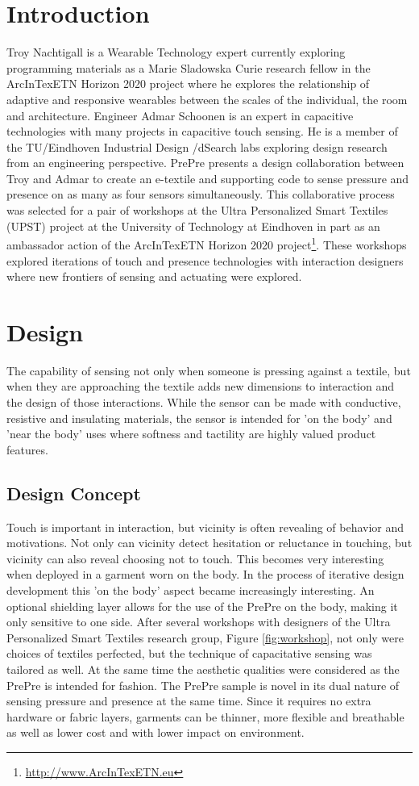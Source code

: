 \documentclass{sigchi-ext}
\begin{document}
\section{Introduction}
Troy Nachtigall is a Wearable Technology expert currently exploring programming materials as a Marie Sladowska Curie research fellow in the ArcInTexETN Horizon 2020 project where he explores the relationship of adaptive and responsive wearables between the scales of the individual, the room and architecture. Engineer Admar Schoonen is an expert in capacitive technologies with many projects in capacitive touch sensing.  He is a member of the TU/Eindhoven Industrial Design /dSearch labs exploring design research from an engineering perspective.  PrePre presents a design collaboration between Troy and Admar to create an e-textile and supporting code to sense pressure and  presence on as many as four sensors simultaneously.  This collaborative process was selected for a pair of workshops at the Ultra Personalized Smart Textiles (UPST) project at the University of Technology at Eindhoven in part as an ambassador action of the ArcInTexETN Horizon 2020 project\footnote{\url{http://www.ArcInTexETN.eu}}. These workshops explored iterations of touch and presence technologies with interaction designers where new frontiers of sensing and actuating were explored.  
\section{Design}
The capability of sensing not only when someone is pressing against a textile, but when they are approaching the textile adds new dimensions to interaction and the design of those interactions.  While the sensor can be made with conductive, resistive and insulating materials, the sensor is intended for 'on the body' and 'near the body' uses where softness and tactility are highly valued product features. 
\subsection{Design Concept}
Touch is important in interaction, but vicinity is often revealing of behavior and motivations.  Not only can vicinity detect hesitation or reluctance in touching, but vicinity can also reveal choosing not to touch. This becomes very interesting when deployed in a garment worn on the body. In the process of iterative design development this 'on the body' aspect became increasingly interesting. An optional shielding layer allows for the use of the PrePre on the body, making it only sensitive to one side. After several workshops with designers of the Ultra Personalized Smart Textiles research group, Figure \ref{fig:workshop}, not only were choices of textiles perfected, but the technique of capacitative sensing was tailored as well. At the same time the aesthetic qualities were considered as the PrePre is intended for fashion. The PrePre sample is novel in its dual nature of sensing pressure and presence at the same time. Since it requires no extra hardware or fabric layers, garments can be thinner, more flexible and breathable as well as lower cost and with lower impact on environment.
\end{document}

